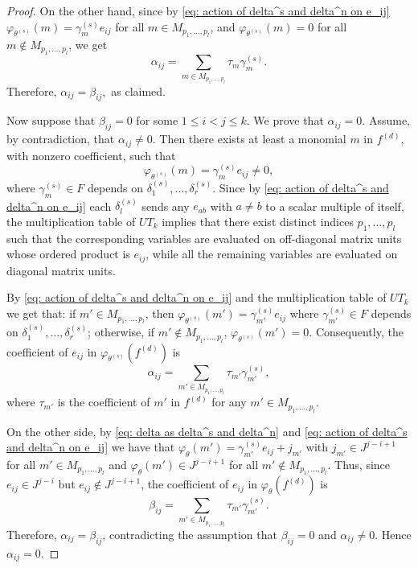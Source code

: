 \documentclass[a4paper,reqno]{amsart}
\theoremstyle{definition}
\numberwithin{equation}{section}
\numberwithin{theorem}{section}
\begin{document}
\begin{proof}
On the other hand, since by \eqref{eq: action of delta^s and delta^n on e_ij}
 $\varphi_{\theta^{(s)}}(m)=\gamma_m^{(s)} e_{ij}$ for all $m\in M_{p_1,\ldots, p_l}$, and
$\varphi_{\theta^{(s)}}(m)=0$ for all $m\notin M_{p_1,\ldots, p_l}$, we get 
$$
\alpha_{ij}=\sum_{m\in M_{p_1,\ldots, p_l}} \tau_m \gamma_m^{(s)}.
$$
Therefore, $\alpha_{ij}=\beta_{ij},$ as claimed.




Now suppose that $\beta_{ij}=0$ for some $1\leq i <j\leq k$. We prove that $\alpha_{ij}=0$. Assume, by contradiction, that $\alpha_{ij}\neq0$.
Then there exists at least a monomial $m$ in $f^{(d)}$, with nonzero coefficient, such that 
$$
\varphi_{\theta^{(s)}}(m)=\gamma_m^{(s)} e_{ij}\neq 0,
$$ 
where $\gamma_m^{(s)}
\in F$ depends on $\delta_1^{(s)}, \ldots, \delta_r^{(s)}$. Since by \eqref{eq: action of delta^s and delta^n on e_ij} each $\delta_l^{(s)}$ sends any $e_{ab}$ with $a\neq b$ to a scalar multiple of itself, the multiplication table of $UT_k$ implies that there exist distinct indices
$p_1,\ldots,p_l$
such that the corresponding variables are evaluated on off-diagonal matrix units whose ordered product is $e_{ij}$, while all the remaining variables are evaluated on diagonal matrix units.

By \eqref{eq: action of delta^s and delta^n on e_ij} and the multiplication table of $UT_k$ we get that: 
if $m'\in M_{p_1,\ldots, p_l}$, then
 $\varphi_{\theta^{(s)}}(m')=\gamma_{m'}^{(s)} e_{ij}$ where $\gamma_{m'}^{(s)}
 \in F$ depends on $\delta_1^{(s)}, \ldots, \delta_r^{(s)}$; otherwise, if $m'\notin M_{p_1,\ldots, p_l}$,
 $\varphi_{\theta^{(s)}}(m')=0$. 
Consequently, the coefficient of $e_{ij}$ in $\varphi_{\theta^{(s)}}(f^{(d)})$ is 
 $$
 \alpha_{ij} =\sum_{m'\in M_{p_1,\ldots, p_l}} \tau_{m'}\gamma_{m'}^{(s)},
 $$ 
 where $\tau_{m'}$ is the coefficient of $m'$ in $f^{(d)}$ for any $m'\in M_{p_1,\ldots, p_l}$.
 
On the other side,  by \eqref{eq: delta as delta^s and delta^n} and \eqref{eq: action of delta^s and delta^n on e_ij} we have that
$\varphi_{\theta}(m')=\gamma_{m'}^{(s)} e_{ij}+ j_{m'}$ with $j_{m'}\in J^{j-i+1}$ for all $m'\in M_{p_1,\ldots, p_l}$ and
 $\varphi_{\theta}(m')\in J^{j-i+1}$ for all $m'\notin M_{p_1,\ldots, p_l}$. Thus,  since $e_{ij}\in J^{j-i}$ but $e_{ij}\notin J^{j-i+1}$, the coefficient of $e_{ij}$ in $\varphi_{\theta}(f^{(d)})$ is
 $$
 \beta_{ij}=\sum_{m'\in M_{p_1,\ldots, p_l}} \tau_{m'} \gamma_{m'}^{(s)}.
 $$
 Therefore, $\alpha_{ij}=\beta_{ij}$, contradicting the assumption that
$
\beta_{ij}=0$ and $
\alpha_{ij}\neq0.
$
Hence
$\alpha_{ij}=0.
$

\end{proof}
\end{document}
